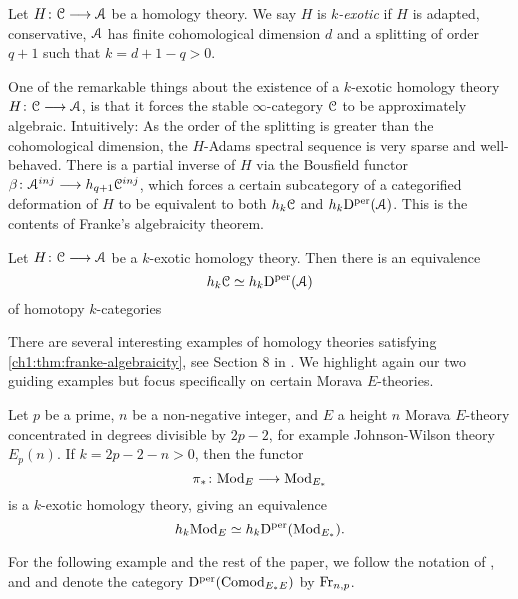 \begin{definition}
    \label{ch1:def:k-exotic-homology-theory}
     Let $H\colon \EuScript{C}\longrightarrow \EuScript{A}$ be a homology theory. We say $H$ is \emph{$k$-exotic} if $H$ is adapted, conservative, $\EuScript{A}$ has finite cohomological dimension $d$ and a splitting of order $q+1$ such that $k=d+1-q>0$. 
\end{definition}
    
One of the remarkable things about the existence of a $k$-exotic homology theory $H\colon \EuScript{C}\longrightarrow \EuScript{A}$, is that it forces the stable $\infty$-category $\EuScript{C}$ to be approximately algebraic. Intuitively: As the order of the splitting is greater than the cohomological dimension, the $H$-Adams spectral sequence is very sparse and well-behaved. There is a partial inverse of $H$ via the Bousfield functor $\beta\colon \EuScript{A}^{inj}\longrightarrow h_{q+1} \EuScript{C}^{inj}$, which forces a certain subcategory of a categorified deformation of $H$ to be equivalent to both $h_k \EuScript{C}$ and $h_k \mathrm{D}^{\mathrm{per}}(\EuScript{A})$. This is the contents of Franke's algebraicity theorem. 
    
\begin{theorem}
    \label{ch1:thm:franke-algebraicity}
    Let $H\colon \EuScript{C}\longrightarrow \EuScript{A}$ be a $k$-exotic homology theory. Then there is an equivalence  
    \[h_k \EuScript{C} \simeq h_k \mathrm{D}^{\mathrm{per}}(\EuScript{A})\]
    of homotopy $k$-categories
\end{theorem}
    
There are several interesting examples of homology theories satisfying \cref{ch1:thm:franke-algebraicity}, see Section 8 in \cite{patchkoria-pstragowski_2021}. We highlight again our two guiding examples but focus specifically on certain Morava $E$-theories. 

\begin{example}
    \label{ch1:ex:chromatic-algebraicity-modules}
    Let $p$ be a prime, $n$ be a non-negative integer, and $E$ a height $n$ Morava $E$-theory concentrated in degrees divisible by $2p-2$, for example Johnson-Wilson theory $E_p(n)$. If $k=2p-2-n>0$, then the functor 
    \[\pi_* \colon \mathrm{Mod}_{E} \longrightarrow \mathrm{Mod}_{E_*}\]
    is a $k$-exotic homology theory, giving an equivalence 
    \[h_k \mathrm{Mod}_{E} \simeq h_k \mathrm{D}^{\mathrm{per}}(\mathrm{Mod}_{E_*}).\]
\end{example}
    
\begin{notation}
    For the following example and the rest of the paper, we follow the notation of \cite{barthel-schlank-stapleton_2020}, \cite{barthel-schlank-stapleton_2021} and \cite{barkan_2023} and denote the category $\mathrm{D}^{\mathrm{per}}(\mathrm{Comod}_{E_*E})$ by $\mathrm{Fr}_{n,p}$. 
\end{notation}
    
